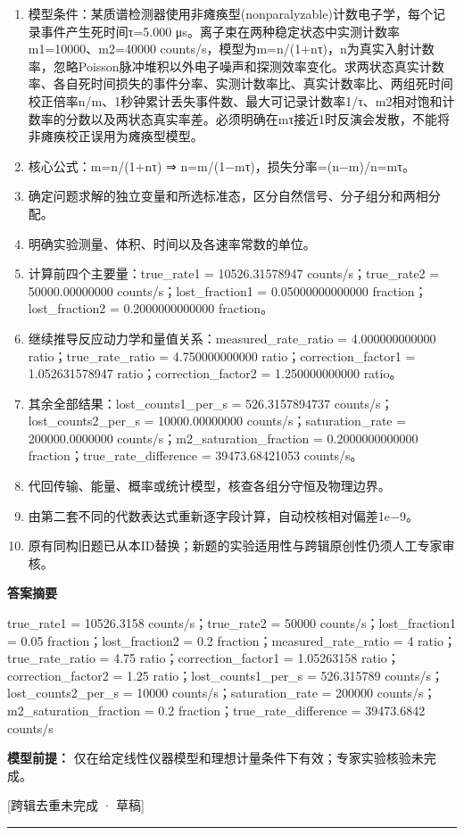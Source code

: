 \documentclass[UTF8,11pt,a4paper]{ctexart}
\begin{document}
\begin{enumerate}
\item 模型条件：某质谱检测器使用非瘫痪型(nonparalyzable)计数电子学，每个记录事件产生死时间τ=5.000 μs。离子束在两种稳定状态中实测计数率m1=10000、m2=40000 counts/s，模型为m=n/(1+nτ)，n为真实入射计数率，忽略Poisson脉冲堆积以外电子噪声和探测效率变化。求两状态真实计数率、各自死时间损失的事件分率、实测计数率比、真实计数率比、两组死时间校正倍率n/m、1秒钟累计丢失事件数、最大可记录计数率1/τ、m2相对饱和计数率的分数以及两状态真实率差。必须明确在mτ接近1时反演会发散，不能将非瘫痪校正误用为瘫痪型模型。
\item 核心公式：m=n/(1+nτ) ⇒ n=m/(1−mτ)，损失分率=(n−m)/n=mτ。
\item 确定问题求解的独立变量和所选标准态，区分自然信号、分子组分和两相分配。
\item 明确实验测量、体积、时间以及各速率常数的单位。
\item 计算前四个主要量：true\_rate1 = 10526.31578947 counts/s；true\_rate2 = 50000.00000000 counts/s；lost\_fraction1 = 0.05000000000000 fraction；lost\_fraction2 = 0.2000000000000 fraction。
\item 继续推导反应动力学和量值关系：measured\_rate\_ratio = 4.000000000000 ratio；true\_rate\_ratio = 4.750000000000 ratio；correction\_factor1 = 1.052631578947 ratio；correction\_factor2 = 1.250000000000 ratio。
\item 其余全部结果：lost\_counts1\_per\_s = 526.3157894737 counts/s；lost\_counts2\_per\_s = 10000.00000000 counts/s；saturation\_rate = 200000.0000000 counts/s；m2\_saturation\_fraction = 0.2000000000000 fraction；true\_rate\_difference = 39473.68421053 counts/s。
\item 代回传输、能量、概率或统计模型，核查各组分守恒及物理边界。
\item 由第二套不同的代数表达式重新逐字段计算，自动校核相对偏差1e−9。
\item 原有同构旧题已从本ID替换；新题的实验适用性与跨辑原创性仍须人工专家审核。
\end{enumerate}
\noindent\textbf{答案摘要}\par
true\_rate1 = 10526.3158 counts/s；true\_rate2 = 50000 counts/s；lost\_fraction1 = 0.05 fraction；lost\_fraction2 = 0.2 fraction；measured\_rate\_ratio = 4 ratio；true\_rate\_ratio = 4.75 ratio；correction\_factor1 = 1.05263158 ratio；correction\_factor2 = 1.25 ratio；lost\_counts1\_per\_s = 526.315789 counts/s；lost\_counts2\_per\_s = 10000 counts/s；saturation\_rate = 200000 counts/s；m2\_saturation\_fraction = 0.2 fraction；true\_rate\_difference = 39473.6842 counts/s\par
\noindent\textbf{模型前提：}
仅在给定线性仪器模型和理想计量条件下有效；专家实验核验未完成。\par
\noindent\textcolor{red!65!black}{[跨辑去重未完成 · 草稿]} \par
\medskip\hrule\medskip
{}
\end{document}
